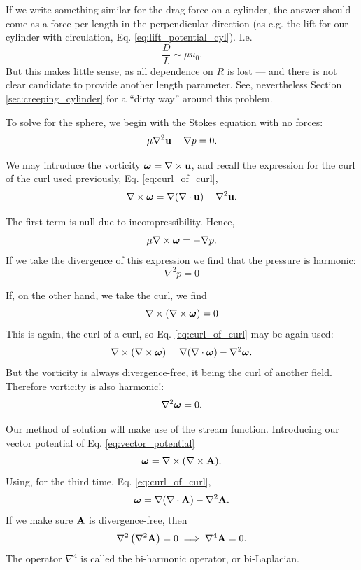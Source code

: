 If we write something similar for the drag force on a cylinder, the
answer should come as a force per length in the perpendicular
direction (as e.g. the lift for our cylinder with circulation,
Eq. \ref{eq:lift_potential_cyl}). I.e.
\begin{equation}
  \label{eq:drag_cyl_guess}
  \frac{D}{L} \sim \mu u_0 .
\end{equation}
%
But this makes little sense, as all dependence on $R$ is lost ---
and there is not clear candidate to provide another length parameter.
See, nevertheless Section \ref{sec:creeping_cylinder} for a ``dirty
way'' around this problem.

To solve for the sphere, we begin with the Stokes equation with no
forces:
\begin{equation}
  \label{eq:Stokes_no_f}
  \mu \nabla^2 \mathbf{u} -\nabla p = 0 .
\end{equation}

We may intruduce the vorticity $\bm{\omega}=\nabla\times\mathbf{u}$, and recall
the expression for the curl of the curl used previously,
Eq. \ref{eq:curl_of_curl},
%
\begin{equation*}
  \nabla \times \bm{\omega} =
  \nabla (\nabla \cdot \mathbf{u} )-\nabla^{2} \mathbf{u} .
\end{equation*}

The first term is null due to incompressibility. Hence,
\[
\mu \nabla \times \bm{\omega} = - \nabla p.
\]
If we take the divergence of this expression we find that the pressure
is harmonic:
\[
  \nabla^2 p = 0
\]

If, on the other hand, we take the curl, we find
\[
  \nabla \times \left(\nabla \times \bm{\omega} \right)= 0
\]
This is again, the curl of a curl, so Eq. \ref{eq:curl_of_curl} may be
again used:
\begin{equation*}
  \nabla \times \left(\nabla \times \bm{\omega} \right)=
  \nabla (\nabla \cdot \bm{\omega} )-\nabla^{2}\bm{\omega} .
\end{equation*}
But the vorticity is always divergence-free, it being the curl of
another field. Therefore vorticity is also harmonic!:
\[
  \nabla^2 \bm{\omega} = 0 .
\]

Our method of solution will make use of the stream
function. Introducing our vector potential of
Eq. \ref{eq:vector_potential}
\[
  \bm{\omega} = \nabla \times ( \nabla \times \mathbf{A} ) .
\]
Using, for the third time,  Eq. \ref{eq:curl_of_curl},
\[
  \bm{\omega} =   \nabla (\nabla \cdot \mathbf {A} )-\nabla^2\mathbf{A} .
\]
If we make sure $\mathbf{A}$ is divergence-free, then
\begin{equation}
  \label{eq:bi-laplacian}
  \nabla^2 \left( \nabla^2\mathbf{A} \right) = 0 \implies
  \nabla^4 \mathbf{A}  = 0 .  
\end{equation}
The operator $\nabla^4$ is called the bi-harmonic operator, or
bi-Laplacian. 

